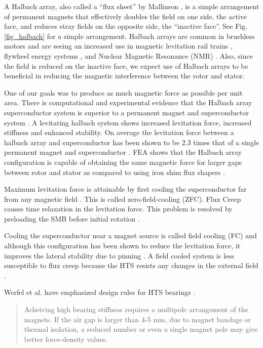 A Halbach array, also called a “flux sheet” by Mallinson \cite{mallinson}, is a simple arrangement of permanent magnets that effectively doubles the field on one side, the active face, and reduces stray fields on the opposite side, the “inactive face”.  See Fig. \ref{fig_halbach} for a simple arrangement.  Halbach arrays are common in brushless motors \cite{Hull1, zhu} and are seeing an increased use in magnetic levitation rail trains \cite{ham, Jing, post}, flywheel energy systems \cite{sotelo2, turner}, and Nuclear Magnetic Resonance (NMR) \cite{raich, soltner}. Also, since the field is reduced on the inactive face, we expect use of Halbach arrays to be beneficial in reducing the magnetic interference between the rotor and stator.  

One of our goals was to produce as much magnetic force as possible per unit area.  There is computational and experimental evidence that the Halbach array superconductor system is superior to a permanent magnet and superconductor system \cite{sotelo2, Hull1, Jing, turner, del1, deng, zhang, del2, liu, deng2}.  A levitating halbach system shows increased levitation force, increased stiffness and enhanced stability.  On average the levitation force between a halbach array and superconductor has been shown to be 2.3 times that of a single permanent magnet and superconductor \cite{Jing}.  FEA shows that the Halbach array configuration is capable of obtaining the same magnetic force for larger gaps between rotor and stator as compared to using iron shim flux shapers \cite{sotelo2}.

Maximum levitation force is attainable by first cooling the superconductor far from any magnetic field \cite{ma, Hull1999, del1, zeisberger2}.  This is called zero-field-cooling (ZFC). Flux Creep causes time relaxation in the levitation force.  This problem is resolved by preloading the SMB before initial rotation \cite{miyazakim, suzuki, postrekhin, ma}.

Cooling the superconductor near a magnet source is called field cooling (FC) and although this configuration has been shown to  reduce the levitation force, it improves the lateral stability due to pinning \cite{ma, Hull1999, del1}.
A field cooled system is less susceptible to flux creep because the HTS resists any changes in the external field \cite{xia}.

Werfel et al. have emphasized design rules for HTS bearings \cite{werfel}.  
\begin{quote} 
Acheiving high bearing stiffness requires a multipole arrangement of the magnets.  If the air gap is larger than 4-5 mm, due to magnet bandage or thermal isolation, a reduced number or even a single magnet pole may give better force-density values. 
\end{quote}

